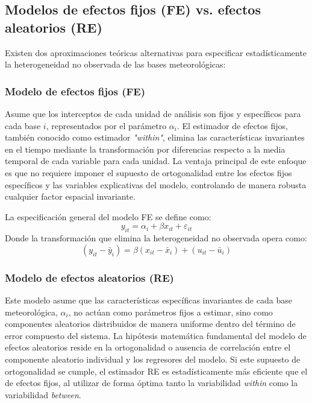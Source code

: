 \subsection{Modelos de efectos fijos (FE) vs. efectos aleatorios (RE)}

Existen dos aproximaciones teóricas alternativas para especificar estadísticamente la heterogeneidad no observada de las bases meteorológicas:

\subsubsection{Modelo de efectos fijos (FE)}
Asume que los interceptos de cada unidad de análisis son fijos y específicos para cada base $i$, representados por el parámetro $\alpha_i$. El estimador de efectos fijos, también conocido como estimador \textit{"within"}, elimina las características invariantes en el tiempo mediante la transformación por diferencias respecto a la media temporal de cada variable para cada unidad. La ventaja principal de este enfoque es que no requiere imponer el supuesto de ortogonalidad entre los efectos fijos específicos y las variables explicativas del modelo, controlando de manera robusta cualquier factor espacial invariante.

La especificación general del modelo FE se define como:
\begin{equation}
    y_{it} = \alpha_i + \beta x_{it} + \varepsilon_{it}
\end{equation}
Donde la transformación que elimina la heterogeneidad no observada opera como:
\begin{equation}
    (y_{it} - \bar{y}_i) = \beta(x_{it} - \bar{x}_i) + (u_{it} - \bar{u}_i)
\end{equation}

\subsubsection{Modelo de efectos aleatorios (RE)}
Este modelo asume que las características específicas invariantes de cada base meteorológica, $\alpha_i$, no actúan como parámetros fijos a estimar, sino como componentes aleatorios distribuidos de manera uniforme dentro del término de error compuesto del sistema. La hipótesis matemática fundamental del modelo de efectos aleatorios reside en la ortogonalidad o ausencia de correlación entre el componente aleatorio individual y los regresores del modelo. Si este supuesto de ortogonalidad se cumple, el estimador RE es estadísticamente más eficiente que el de efectos fijos, al utilizar de forma óptima tanto la variabilidad \textit{within} como la variabilidad \textit{between}.

